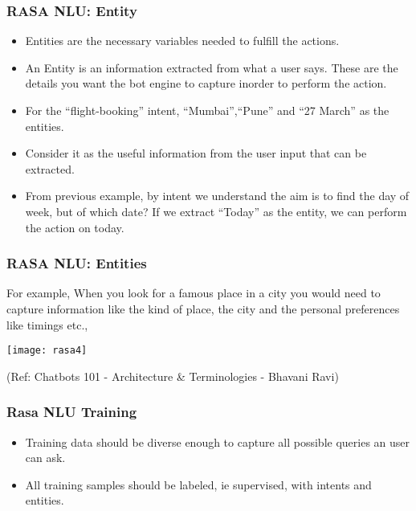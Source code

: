  \begin{frame}[fragile]\frametitle{RASA NLU: Entity}
\begin{itemize}
\item Entities are the necessary variables needed to fulfill the actions.
\item An Entity is an information extracted from what a user says. These are the details you want the bot engine to capture inorder to perform the action.
\item For the ``flight-booking'' intent, ``Mumbai'',``Pune'' and ``27 March'' as the entities. 
\item Consider it as the useful information from the user input that can be extracted. 
\item From previous example, by intent we understand the aim is to find the day of week, but of which date? If we extract ``Today'' as the entity, we can perform the action on today.
\end{itemize}


\end{frame}

 \begin{frame}[fragile]\frametitle{RASA NLU: Entities}
For example, When you look for a famous place in a city you would need to capture information like the kind of place, the city and the personal preferences like timings etc.,


\begin{center}
\texttt{[image: rasa4]}
\end{center}

{\tiny (Ref: Chatbots 101 - Architecture \& Terminologies -  Bhavani Ravi)}

\end{frame}


 \begin{frame}[fragile]\frametitle{Rasa NLU Training}

\begin{itemize}
\item Training data should be diverse enough to capture all possible queries an user can ask.
\item All training samples should be labeled, ie supervised, with intents and entities.
\end{itemize}

\end{frame}

